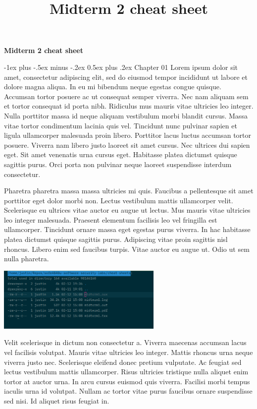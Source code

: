 \documentclass[10pt,landscape]{article}
\title{Midterm 2 cheat sheet}
\makeatletter
\renewcommand{\section}{\@startsection{section}{1}{0mm}%
    {-1ex plus -.5ex minus -.2ex}%
    {0.5ex plus .2ex}%
    {\normalfont\large\bfseries}}
\makeatother
\begin{document}
\raggedright
\footnotesize

\begin{center}
    \Large{\textbf{Midterm 2 cheat sheet}} \\
\end{center}
\begin{multicols}{3}
\setlength{\premulticols}{1pt}
\setlength{\postmulticols}{1pt}
\setlength{\multicolsep}{1pt}
\setlength{\columnsep}{2pt}

\section{Chapter 01}
Lorem ipsum dolor sit amet, consectetur adipiscing elit, sed do
eiusmod tempor incididunt ut labore et dolore magna aliqua. In eu mi
bibendum neque egestas congue quisque. Accumsan tortor posuere ac ut
consequat semper viverra. Nec nam aliquam sem et tortor consequat id
porta nibh. Ridiculus mus mauris vitae ultricies leo integer. Nulla
porttitor massa id neque aliquam vestibulum morbi blandit
cursus. Massa vitae tortor condimentum lacinia quis vel. Tincidunt
nunc pulvinar sapien et ligula ullamcorper malesuada proin
libero. Porttitor lacus luctus accumsan tortor posuere. Viverra nam
libero justo laoreet sit amet cursus. Nec ultrices dui sapien
eget. Sit amet venenatis urna cursus eget. Habitasse platea dictumst
quisque sagittis purus. Orci porta non pulvinar neque laoreet
suspendisse interdum consectetur.

Pharetra pharetra massa massa ultricies mi quis. Faucibus a
pellentesque sit amet porttitor eget dolor morbi non. Lectus
vestibulum mattis ullamcorper velit. Scelerisque eu ultrices vitae
auctor eu augue ut lectus. Mus mauris vitae ultricies leo integer
malesuada. Praesent elementum facilisis leo vel fringilla est
ullamcorper. Tincidunt ornare massa eget egestas purus viverra. In hac
habitasse platea dictumst quisque sagittis purus. Adipiscing vitae
proin sagittis nisl rhoncus. Libero enim sed faucibus turpis. Vitae
auctor eu augue ut. Odio ut sem nulla pharetra.

\includegraphics[width=8cm]{test}

Velit scelerisque in dictum non consectetur a. Viverra maecenas
accumsan lacus vel facilisis volutpat. Mauris vitae ultricies leo
integer. Mattis rhoncus urna neque viverra justo nec. Scelerisque
eleifend donec pretium vulputate. Ac feugiat sed lectus vestibulum
mattis ullamcorper. Risus ultricies tristique nulla aliquet enim
tortor at auctor urna. In arcu cursus euismod quis viverra. Facilisi
morbi tempus iaculis urna id volutpat. Nullam ac tortor vitae purus
faucibus ornare suspendisse sed nisi. Id aliquet risus feugiat in.


\end{multicols}
\end{document}
